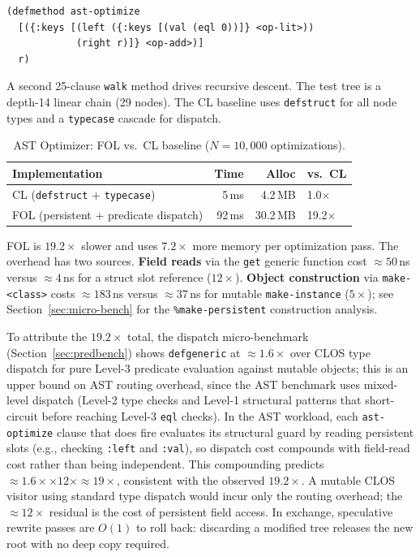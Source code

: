 \documentclass[sigconf,nonacm]{acmart}
\begin{document}
\begin{lstlisting}
(defmethod ast-optimize
  [({:keys [(left ({:keys [(val (eql 0))]} <op-lit>))
            (right r)]} <op-add>)]
  r)
\end{lstlisting}

\noindent A second 25-clause \texttt{walk} method drives recursive descent. The test tree is a depth-14 linear chain (29 nodes). The CL baseline uses \texttt{defstruct} for all node types and a \texttt{typecase} cascade for dispatch.

\begin{table}[htbp]
\small
\caption{AST Optimizer: FOL vs.\ CL baseline ($N=10{,}000$ optimizations).}
\label{tab:ast-bench}
\begin{tabular}{lrrl}
\toprule
\textbf{Implementation} & \textbf{Time} & \textbf{Alloc} & \textbf{vs.\ CL} \\
\midrule
CL (\texttt{defstruct} + \texttt{typecase}) & 5\,ms  &  4.2\,MB & 1.0$\times$ \\
FOL (persistent + predicate dispatch)        & 92\,ms & 30.2\,MB & 19.2$\times$ \\
\bottomrule
\end{tabular}
\end{table}

FOL is $19.2{\times}$ slower and uses $7.2{\times}$ more memory per optimization pass. The overhead has two sources. \textbf{Field reads} via the \texttt{get} generic function cost ${\approx}50$\,ns versus ${\approx}4$\,ns for a struct slot reference ($12{\times}$). \textbf{Object construction} via \texttt{make-<class>} costs ${\approx}183$\,ns versus ${\approx}37$\,ns for mutable \texttt{make-instance} ($5{\times}$); see Section~\ref{sec:micro-bench} for the \texttt{\%make-persistent} construction analysis.

To attribute the $19.2{\times}$ total, the dispatch micro-benchmark (Section~\ref{sec:predbench}) shows \texttt{defgeneric} at ${\approx}1.6{\times}$ over CLOS type dispatch for pure Level-3 predicate evaluation against mutable objects; this is an upper bound on AST routing overhead, since the AST benchmark uses mixed-level dispatch (Level-2 type checks and Level-1 structural patterns that short-circuit before reaching Level-3 \texttt{eql} checks). In the AST workload, each \texttt{ast-optimize} clause that does fire evaluates its structural guard by reading persistent slots (e.g., checking \texttt{:left} and \texttt{:val}), so dispatch cost compounds with field-read cost rather than being independent. This compounding predicts ${\approx}1.6{\times} \times 12{\times} \approx 19{\times}$, consistent with the observed $19.2{\times}$. A mutable CLOS visitor using standard type dispatch would incur only the routing overhead; the ${\approx}12{\times}$ residual is the cost of persistent field access. In exchange, speculative rewrite passes are $O(1)$ to roll back: discarding a modified tree releases the new root with no deep copy required.
\end{document}
